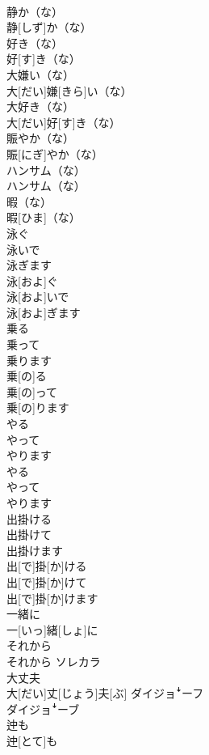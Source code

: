 \documentclass[8pt]{extreport}
\begin{document}
\begin{CJK}{UTF8}{min}
\\	静か（な）	
\\	静[しず]か（な）	
\\	好き（な）	
\\	好[す]き（な）	
\\	大嫌い（な）	
\\	大[だい]嫌[きら]い（な）	
\\	大好き（な）	
\\	大[だい]好[す]き（な）	
\\	賑やか（な）	
\\	賑[にぎ]やか（な）	
\\	ハンサム（な）	
\\	ハンサム（な）	
\\	暇（な）	
\\	暇[ひま]（な）	
\\	泳ぐ 
\\	泳いで 
\\	泳ぎます	
\\	泳[およ]ぐ 
\\	泳[およ]いで 
\\	泳[およ]ぎます	
\\	乗る 
\\	乗って 
\\	乗ります	
\\	乗[の]る 
\\	乗[の]って 
\\	乗[の]ります	
\\	やる 
\\	やって 
\\	やります	
\\	やる 
\\	やって 
\\	やります	
\\	出掛ける 
\\	出掛けて 
\\	出掛けます	
\\	出[で]掛[か]ける 
\\	出[で]掛[か]けて 
\\	出[で]掛[か]けます	
\\	一緒に	
\\	一[いっ]緒[しょ]に	
\\	それから	
\\	それから	ソレカラ
\\	大丈夫	
\\	大[だい]丈[じょう]夫[ぶ]	ダイジョꜜーフ 
\\	ダイジョꜜーブ
\\	迚も	
\\	迚[とて]も	

\end{CJK}
\end{document}
